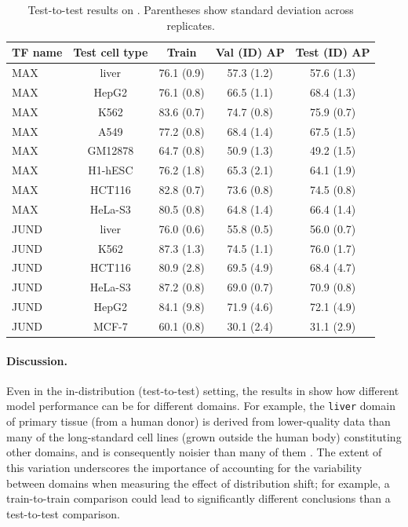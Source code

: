 \begin{table}[t]
  \caption{Test-to-test results on \Encode.
  Parentheses show standard deviation across replicates.
  }
  \label{tab:results_id_full}
  \begin{center}
  \begin{small}
  \begin{tabular}{lcccc}
  \toprule
  TF name  & Test cell type & Train & Val (ID) AP & Test (ID) AP\\
  \midrule \midrule
  MAX  & liver  & 76.1 (0.9)  &  57.3 (1.2)  &  57.6 (1.3) \\
  \midrule
  MAX  & HepG2  & 76.1 (0.8)  &  66.5 (1.1)  &  68.4 (1.3) \\
  MAX  & K562  & 83.6 (0.7)  &  74.7 (0.8)  &  75.9 (0.7)  \\
  MAX  & A549  &  77.2 (0.8)  &  68.4 (1.4)  &  67.5 (1.5)  \\
  MAX  & GM12878  &  64.7 (0.8)  &  50.9 (1.3)  &  49.2 (1.5)  \\
  MAX  & H1-hESC  &  76.2 (1.8)  &  65.3 (2.1)  &  64.1 (1.9) \\
  MAX  & HCT116  &  82.8 (0.7)  &  73.6 (0.8)  &  74.5 (0.8)  \\
  MAX  & HeLa-S3  &  80.5 (0.8)  &  64.8 (1.4)  &  66.4 (1.4)  \\
  \midrule \midrule
  JUND  & liver  &  76.0 (0.6)  &  55.8 (0.5)  &  56.0 (0.7) \\
  \midrule
  JUND  & K562  & 87.3 (1.3)  &  74.5 (1.1)  &  76.0 (1.7)  \\
  JUND  & HCT116  &  80.9 (2.8)  &  69.5 (4.9)  &  68.4 (4.7)  \\
  JUND  & HeLa-S3  &  87.2 (0.8)  &  69.0 (0.7)  &  70.9 (0.8) \\
  JUND  & HepG2  &  84.1 (9.8)  &  71.9 (4.6)  &  72.1 (4.9) \\
  JUND  & MCF-7  &  60.1 (0.8)  &  30.1 (2.4)  &  31.1 (2.9) \\
  \bottomrule
  \end{tabular}
  \end{small}
  \end{center}
  \vspace{-4mm}
\end{table}


\paragraph{Discussion.}
Even in the in-distribution (test-to-test) setting, the results in  show how
different model performance can be for different domains.
For example, the \texttt{liver} domain of primary tissue (from a human donor) is derived from lower-quality data than many of the long-standard cell lines (grown outside the human body) constituting other domains, and is consequently noisier than many of them \citep{EDneurips17}.
The extent of this variation underscores the importance of accounting for the variability between domains when measuring the effect of distribution shift;
for example, a train-to-train comparison could lead to significantly different conclusions than a test-to-test comparison.

